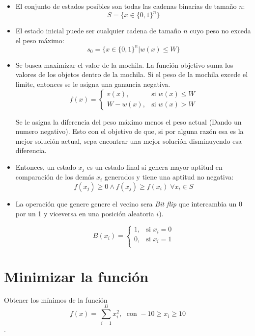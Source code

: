 \begin{itemize}
	\item El conjunto de estados posibles son todas las cadenas binarias de tamaño $n$: \[ S = \{ x \in \{ 0, 1  \}^n \} \]
	
	\item El estado inicial puede ser cualquier cadena de tamaño $n$ cuyo peso no exceda el peso máximo: \[ s_0 = \{x \in \{0,1\}^n | w(x) \leq W \} \]
	
	\item Se busca maximizar el valor de la mochila. La función objetivo suma los valores de los objetos dentro de la mochila. Si el peso de la mochila excede el limite, entonces se le asigna una ganancia negativa. 
	\[
	f(x) =
	\begin{cases} 
		v(x), & \text{si } w(x) \leq W \\ 
		W - w(x), & \text{si } w(x) > W
	\end{cases}
	\]
	
	Se le asigna la diferencia del peso máximo menos el peso actual (Dando un numero negativo). Esto con el objetivo de que, si por alguna razón esa es la mejor solución actual, sepa encontrar una mejor solución disminuyendo esa diferencia.
	
	\item Entonces, un estado $x_j$ es un estado final si genera mayor aptitud en comparación de los demás $x_i$ generados y tiene una aptitud no negativa: \[ f(x_j) \geq 0 \land f(x_j) \geq f(x_i) \; \forall x_i \in S\]
	
	\item La operación que genere genere el vecino sera \textit{Bit flip} que intercambia un 0 por un 1 y viceversa en una posición aleatoria $i$).
	
	\[
	B(x_i) =
	\begin{cases} 
		1, & \text{si } x_i = 0 \\ 
		0, & \text{si } x_i = 1 \\
	\end{cases}
	\]
	
\end{itemize}

\section{Minimizar la función}

Obtener los mínimos de la función \[ f(x) = \ \sum_{i = 1}^{D} x_i^2, \; \text{ con } -10 \geq x_i \geq 10 \].

